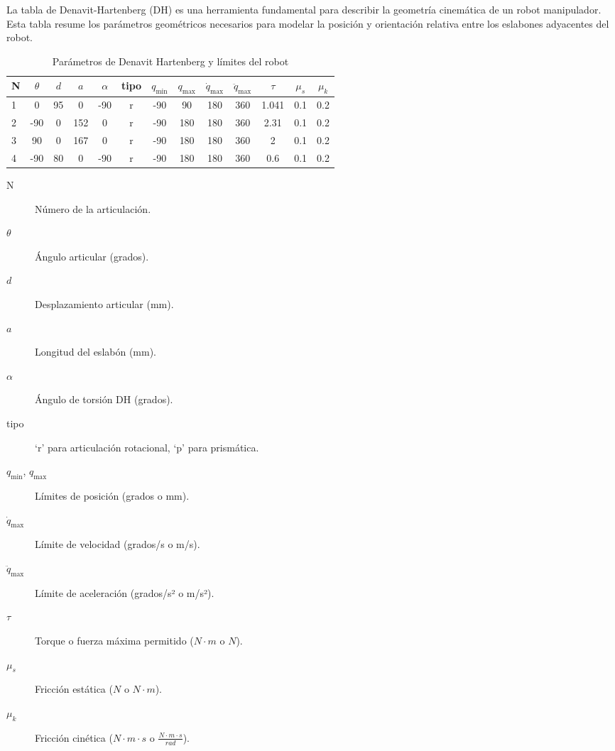 	La tabla de Denavit-Hartenberg (DH) es una herramienta fundamental para describir la geometría cinemática de un robot manipulador. Esta tabla resume los parámetros geométricos necesarios para modelar la posición y orientación relativa entre los eslabones adyacentes del robot.
\begin{table}[ht]

	\centering
	\caption{Parámetros de Denavit Hartenberg y límites del robot}
	\label{tab:parametros_robot}
	\begin{tabular}{ l|cccccccccccc
		}
		\toprule
		N & {$\theta$} & {$d$} & {$a$} & {$\alpha$} & {tipo} 
		& {$q_{\min}$} & {$q_{\max}$} 
		& {$\dot q_{\max}$} & {$\ddot q_{\max}$} 
		& {$\tau$} & {$\mu_s$} & {$\mu_k$} \\
		\midrule
		1 & 0 & 95 & 0  & -90   & r & -90 & 90 & 180 & 360 &  1.041  & 0.1 & 0.2 \\
		2 & -90 & 0 & 152  & 0 & r & -90 & 180 & 180 & 360 & 2.31  & 0.1 & 0.2 \\
		3 & 90 & 0 & 167  & 0 & r & -90 & 180 & 180 & 360 & 2  & 0.1 & 0.2 \\
		4 & -90 & 80 & 0  & -90   & r &   -90 &  180 &   180 &   360 & 0.6  & 0.1 & 0.2 \\
		\bottomrule
	\end{tabular}
\end{table}
\bigskip
\noindent
\begin{description}
	\item[N] Número de la articulación.
	\item[\(\theta\)] Ángulo articular (grados).
	\item[\(d\)] Desplazamiento articular (mm).
	\item[\(a\)] Longitud del eslabón (mm).
	\item[\(\alpha\)] Ángulo de torsión DH (grados).
	\item[tipo] ‘r’ para articulación rotacional, ‘p’ para prismática.
	\item[\(q_{\min}\), \(q_{\max}\)] Límites de posición (grados o mm).
	\item[\(\dot q_{\max}\)] Límite de velocidad (grados/s o m/s).
	\item[\(\ddot q_{\max}\)] Límite de aceleración (grados/s² o m/s²).
	\item[\(\tau\)] Torque o fuerza máxima permitido (\(N \cdot m\) o \(N\)).
	\item[\(\mu_s\)] Fricción estática (\(N\) o \(N \cdot m\)).
	\item[\(\mu_k\)] Fricción cinética (\(N \cdot m \cdot s\) o \(\frac{N \cdot m \cdot s}{rad}\)).
\end{description}


